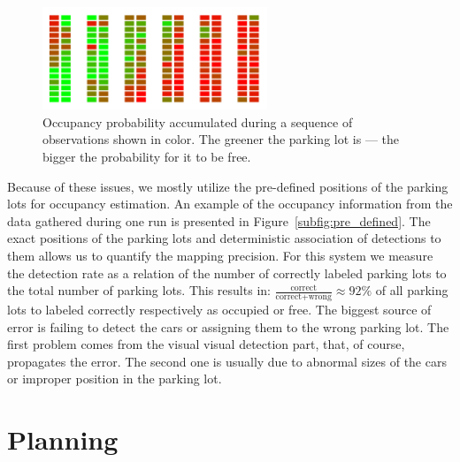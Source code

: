 \begin{figure}[t]
    \begin{center}
        \includegraphics[width=0.6\textwidth]{pictures/parking_lots.png}
    \end{center}
    \caption{Occupancy probability accumulated during a sequence of observations shown in color. The greener the parking lot is --- the bigger the probability for it to be free.}
    \label{fig:occupancy_accumulated}
\end{figure}

Because of these issues, we mostly utilize the pre-defined positions of the
parking lots for occupancy estimation. An example of the occupancy information
from the data gathered during one run is presented in
Figure~\ref{subfig:pre_defined}. The exact positions of the parking lots and
deterministic association of detections to them allows us to quantify the
mapping precision. For this system we measure the detection rate as a relation
of the number of correctly labeled parking lots to the total number of parking
lots. This results in: $\frac{\mbox{correct}}{\mbox{correct} + \mbox{wrong}}
\approx 92\% $ of all parking lots to labeled correctly respectively as
occupied or free. The biggest source of error is failing to detect the cars or
assigning them to the wrong parking lot. The first problem comes from the
visual visual detection part, that, of course, propagates the error. The
second one is usually due to abnormal sizes of the cars or improper position
in the parking lot.



\section{Planning}
\label{sec:planning_results}


